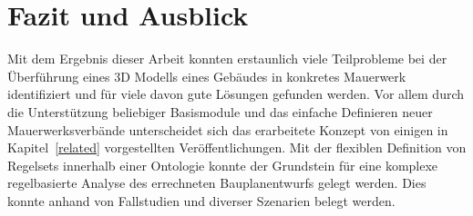 \chapter{Fazit und Ausblick}
Mit dem Ergebnis dieser Arbeit konnten erstaunlich viele Teilprobleme bei der Überführung eines 3D Modells eines Gebäudes in konkretes Mauerwerk identifiziert und für viele davon gute Lösungen gefunden werden.
Vor allem durch die Unterstützung beliebiger Basismodule und das einfache Definieren neuer Mauerwerksverbände unterscheidet sich das erarbeitete Konzept von einigen in Kapitel~\ref{related} vorgestellten Veröffentlichungen.
Mit der flexiblen Definition von Regelsets innerhalb einer Ontologie konnte der Grundstein für eine komplexe regelbasierte Analyse des errechneten Bauplanentwurfs gelegt werden.
Dies konnte anhand von Fallstudien und diverser Szenarien belegt werden.

